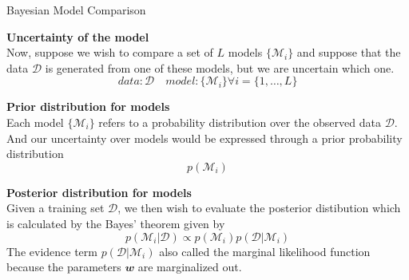 \documentclass{bredelebeamer}
\begin{document}
\begin{frame}{Bayesian Model Comparison}
\begin{justify}
  \textbf{Uncertainty of the model} \\
  Now, suppose we wish to compare a set of $L$ models $\{\mathcal{M}_i\}$ and
  suppose that the data $\mathcal{D}$ is generated from one of these models, but
  we are uncertain which one.
  \begin{equation}
    data: \mathcal{D} \quad model: \{\mathcal{M}_i\} \forall i = \{1,\ldots,L\}
  \end{equation}

  \vspace{0.5\baselineskip}
  \textbf{Prior distribution for models} \\
  Each model $\{\mathcal{M}_i\}$ refers to a probability distribution over the
  observed data $\mathcal{D}$. And our uncertainty over models would be expressed
  through a prior probability distribution
  \begin{equation}
    p(\mathcal{M}_i)
  \end{equation}

  \vspace{0.5\baselineskip}
  \textbf{Posterior distribution for models} \\
  Given a training set $\mathcal{D}$, we then wish to evaluate the posterior distibution
  which is calculated by the Bayes' theorem given by
  \begin{equation}
    p(\mathcal{M}_i|\mathcal{D}) \propto p(\mathcal{M}_i) p(\mathcal{D}|\mathcal{M}_i)
  \end{equation}
  The evidence term $p(\mathcal{D}|\mathcal{M}_i)$ also called the marginal likelihood
  function because the parameters $\mathbfit{w}$ are marginalized out.
\end{justify}
\end{frame}
\end{document}
